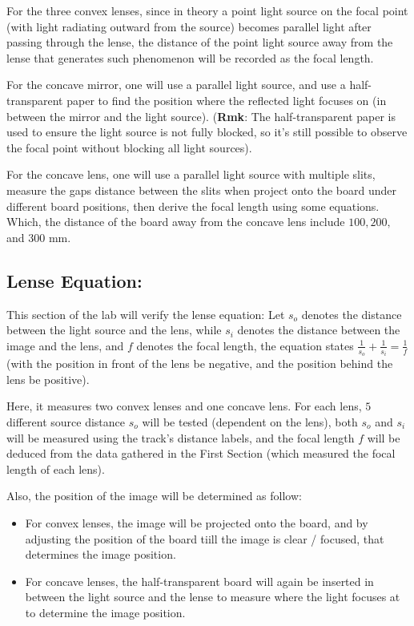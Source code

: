 \documentclass{article}
\begin{document}
For the three convex lenses, since in theory a point light source on the focal point (with light radiating outward from the source) becomes parallel light after passing through the lense, the distance of the point light source away from the lense that generates such phenomenon will be recorded as the focal length.

For the concave mirror, one will use a parallel light source, and use a half-transparent paper to find the position where the reflected light focuses on (in between the mirror and the light source). (\textbf{Rmk}: The half-transparent paper is used to ensure the light source is not fully blocked, so it's still possible to observe the focal point without blocking all light sources).

For the concave lens, one will use a parallel light source with multiple slits, measure the gaps distance between the slits when project onto the board under different board positions, then derive the focal length using some equations. Which, the distance of the board away from the concave lens include $100, 200,$ and $300$ mm.

\hfil

\subsection{Lense Equation:}
This section of the lab will verify the lense equation: Let $s_o$ denotes the distance between the light source and the lens, while $s_i$ denotes the distance between the image and the lens, and $f$ denotes the focal length, the equation states $\frac{1}{s_o}+\frac{1}{s_i}=\frac{1}{f}$ (with the position in front of the lens be negative, and the position behind the lens be positive).

Here, it measures two convex lenses and one concave lens. For each lens, $5$ different source distance $s_o$ will be tested (dependent on the lens), both $s_o$ and $s_i$ will be measured using the track's distance labels, and the focal length $f$ will be deduced from the data gathered in the First Section (which measured the focal length of each lens).

Also, the position of the image will be determined as follow:
\begin{itemize}
    \item For convex lenses, the image will be projected onto the board, and by adjusting the position of the board tiill the image is clear / focused, that determines the image position.
    \item For concave lenses, the half-transparent board will again be inserted in between the light source and the lense to measure where the light focuses at to determine the image position.
\end{itemize}
\end{document}
